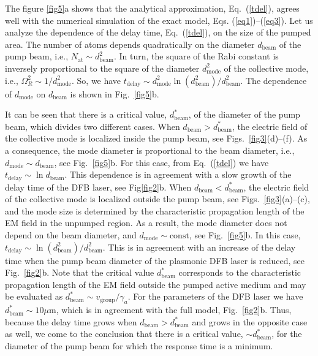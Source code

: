 \documentclass[aps,pra,amsmath,amssymb,onecolumn,superscriptaddress,showpacs,floatfix,]{revtex4-1}
\begin{document}
The figure \ref{fig5}a shows that the analytical approximation, Eq.~(\ref{tdel}), agrees well with the numerical simulation of the exact model, Eqs. (\ref{eq1})--(\ref{eq3}).
Let us analyze the dependence of the delay time, Eq.~(\ref{tdel}), on the size of the pumped area.
The number of atoms depends quadratically on the diameter $d_{\text{beam}}$ of the pump beam, i.e., $N_{\text{at}} \sim d_{\text{beam}}^2$.
In turn, the square of the Rabi constant is inversely proportional to the square of the diameter $d_{\text{mode}}^2$ of the collective mode, i.e., $\Omega_{R}^{2} \sim 1/d_{\text{mode}}^2$.
So, we have $t_{\text{delay}} \sim d_{\text{mode}}^2\ln \left( d_{\text{beam}}^2 \right ) /d_{\text{beam}}^2$.
The dependence of $d_{\text{mode}}$ on $d_{\text{beam}}$ is shown in Fig.~\ref{fig5}b.

It can be seen that there is a critical value, $d_{\text{beam}}^*$, of the diameter of the pump beam, which divides two different cases.
When $d_{\text{beam}}>d_{\text{beam}}^*$, the electric field of the collective mode is localized inside the pump beam, see Figs.~\ref{fig3}(d)--(f).
As a consequence, the mode diameter is proportional to the beam diameter, i.e., $d_{\text{mode}} \sim d_{\text{beam}}$, see Fig.~\ref{fig5}b.
For this case, from Eq.~(\ref{tdel}) we have $t_{\text{delay}} \sim \ln d_{\text{beam}}$.
This dependence is in agreement with a slow growth of the delay time of the DFB laser, see Fig\ref{fig2}b.
When $d_{\text{beam}}<d_{\text{beam}}^*$, the electric field of the collective mode is localized outside the pump beam, see Figs.~\ref{fig3}(a)--(c), and the mode size is determined by the characteristic propagation length of the EM field in the unpumped region.
As a result, the mode diameter does not depend on the beam diameter, and $d_{\text{mode}} \sim \text{const}$, see Fig.~\ref{fig5}b.
In this case, $t_{\text{delay}} \sim \ln(d_{\text{beam}}^2)/d_{\text{beam}}^2$.
This is in agreement with an increase of the delay time  when the pump beam diameter of the plasmonic DFB laser is reduced, see Fig.~\ref{fig2}b.
Note that the critical value $d_{\text{beam}}^*$ corresponds to the characteristic propagation length of the EM field outside the pumped active medium and may be evaluated as $d_{\text{beam}}^* \sim v_{\text{group}}/\gamma_a$.
For the parameters of the DFB laser we have $d_{\text{beam}}^* \sim 10 \mu \text{m}$, which is in agreement with the full model, Fig.~\ref{fig2}b.
Thus, because the delay time grows when $d_{\text{beam}}>d_{\text{beam}}^*$ and grows in the opposite case as well, we come to the conclusion that there is a critical value, $\sim d_{\text{beam}}^*$, for the diameter of the pump beam for which the response time is a minimum.
\end{document}
